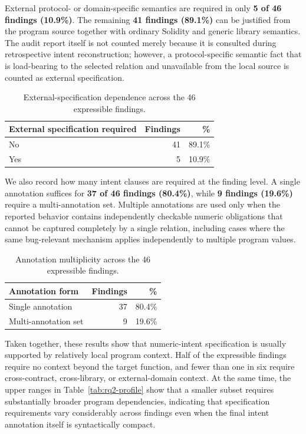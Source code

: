 \documentclass[pdflatex,sn-basic]{sn-jnl}%
\theoremstyle{thmstyleone}%
\theoremstyle{thmstyletwo}%
\theoremstyle{thmstylethree}%
\begin{document}
External protocol- or domain-specific semantics are required in only
\textbf{5 of 46 findings (10.9\%)}. The remaining
\textbf{41 findings (89.1\%)} can be justified from the program source together
with ordinary Solidity and generic library semantics. The audit report itself is
not counted merely because it is consulted during retrospective intent
reconstruction; however, a protocol-specific semantic fact that is load-bearing
to the selected relation and unavailable from the local source is counted as
external specification.

\begin{table}[t]
\centering
\caption{External-specification dependence across the 46 expressible findings.}
\label{tab:rq2-extspec}
\small
\begin{tabular}{lrr}
\toprule
\textbf{External specification required} & \textbf{Findings} & \textbf{\%} \\
\midrule
No  & 41 & 89.1\% \\
Yes &  5 & 10.9\% \\
\bottomrule
\end{tabular}
\end{table}

We also record how many intent clauses are required at the finding level.
A single annotation suffices for \textbf{37 of 46 findings (80.4\%)}, while
\textbf{9 findings (19.6\%)} require a multi-annotation set. Multiple annotations
are used only when the reported behavior contains independently checkable numeric
obligations that cannot be captured completely by a single relation, including
cases where the same bug-relevant mechanism applies independently to multiple
program values.

\begin{table}[t]
\centering
\caption{Annotation multiplicity across the 46 expressible findings.}
\label{tab:rq2-complexity}
\small
\begin{tabular}{lrr}
\toprule
\textbf{Annotation form} & \textbf{Findings} & \textbf{\%} \\
\midrule
Single annotation     & 37 & 80.4\% \\
Multi-annotation set  &  9 & 19.6\% \\
\bottomrule
\end{tabular}
\end{table}

Taken together, these results show that numeric-intent specification is usually
supported by relatively local program context. Half of the expressible findings
require no context beyond the target function, and fewer than one in six require
cross-contract, cross-library, or external-domain context. At the same time, the
upper ranges in Table~\ref{tab:rq2-profile} show that a smaller subset requires
substantially broader program dependencies, indicating that specification
requirements vary considerably across findings even when the final intent
annotation itself is syntactically compact.
\end{document}
